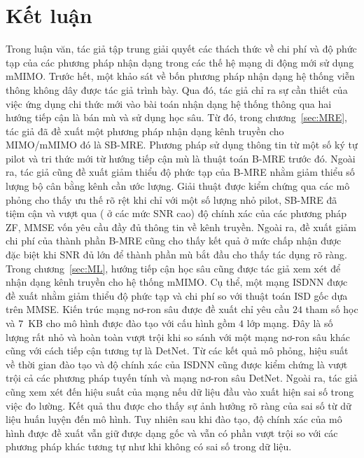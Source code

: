 \clearpage
{}

\chapter*{Kết luận}

Trong luận văn, tác giả tập trung giải quyết các thách thức về chi phí và độ phức tạp của các phương pháp nhận dạng trong các thế hệ mạng di động mới sử dụng mMIMO. Trước hết, một khảo sát về bốn phương pháp nhận dạng hệ thống viễn thông không dây được tác giả trình bày. Qua đó, tác giả chỉ ra sự cần thiết của việc ứng dụng chi thức mới vào bài toán nhận dạng hệ thống thông qua hai hướng tiếp cận là bán mù và sử dụng học sâu. Từ đó, trong chương~\ref{sec:MRE}, tác giả đã đề xuất một phương pháp nhận dạng kênh truyền cho MIMO/mMIMO đó là SB-MRE. Phương pháp sử dụng thông tin từ một số ký tự pilot và tri thức mới từ hướng tiếp cận mù là thuật toán B-MRE trước đó. Ngoài ra, tác giả cũng đề xuất giảm thiểu độ phức tạp của B-MRE nhằm giảm thiểu số lượng bộ cân bằng kênh cần ước lượng. Giải thuật được kiểm chứng qua các mô phỏng cho thấy ưu thế rõ rệt khi chỉ với một số lượng nhỏ pilot, SB-MRE đã tiệm cận và vượt qua ( ở các mức SNR cao) độ chính xác của các phương pháp ZF, MMSE vốn yêu cầu đầy đủ thông tin về kênh truyền. Ngoài ra, đề xuất giảm chi phí của thành phần B-MRE cũng cho thấy kết quả ở mức chấp nhận được đặc biệt khi SNR đủ lớn để thành phần mù bắt đầu cho thấy tác dụng rõ ràng. Trong chương~\ref{sec:ML}, hướng tiếp cận học sâu cũng được tác giả xem xét để nhận dạng kênh truyền cho hệ thống mMIMO. Cụ thể, một mạng ISDNN được đề xuất nhằm giảm thiểu độ phức tạp và chi phí so với thuật toán ISD gốc dựa trên MMSE. Kiến trúc mạng nơ-ron sâu được đề xuất chỉ yêu cầu $24$ tham số học và $7$~KB cho mô hình được đào tạo với cấu hình gồm $4$ lớp mạng. Đây là số lượng rất nhỏ và hoàn toàn vượt trội khi so sánh với một mạng nơ-ron sâu khác cũng với cách tiếp cận tương tự là DetNet. Từ các kết quả mô phỏng, hiệu suất về thời gian đào tạo và độ chính xác của ISDNN cũng được kiểm chứng là vượt trội cả các phương pháp tuyến tính và mạng nơ-ron sâu DetNet. Ngoài ra, tác giả cũng xem xét đến hiệu suất của mạng nếu dữ liệu đầu vào xuất hiện sai số trong việc đo lường. Kết quả thu được cho thấy sự ảnh hưởng rõ ràng của sai số từ dữ liệu huấn luyện đến mô hình. Tuy nhiên sau khi đào tạo, độ chính xác của mô hình được đề xuất vẫn giữ được dạng gốc và vẫn có phần vượt trội so với các phương pháp khác tương tự như khi không có sai số trong dữ liệu. 

